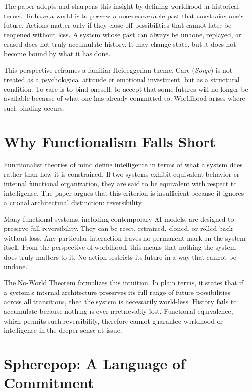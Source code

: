 \documentclass[11pt]{article}
\begin{document}
The paper adopts and sharpens this insight by defining worldhood in historical terms. To have a world is to possess a non-recoverable past that constrains one’s future. Actions matter only if they close off possibilities that cannot later be reopened without loss. A system whose past can always be undone, replayed, or erased does not truly accumulate history. It may change state, but it does not become bound by what it has done.

This perspective reframes a familiar Heideggerian theme. Care (\textit{Sorge}) is not treated as a psychological attitude or emotional investment, but as a structural condition. To care is to bind oneself, to accept that some futures will no longer be available because of what one has already committed to. Worldhood arises where such binding occurs.

\section{Why Functionalism Falls Short}

Functionalist theories of mind define intelligence in terms of what a system does rather than how it is constrained. If two systems exhibit equivalent behavior or internal functional organization, they are said to be equivalent with respect to intelligence. The paper argues that this criterion is insufficient because it ignores a crucial architectural distinction: reversibility.

Many functional systems, including contemporary AI models, are designed to preserve full reversibility. They can be reset, retrained, cloned, or rolled back without loss. Any particular interaction leaves no permanent mark on the system itself. From the perspective of worldhood, this means that nothing the system does truly matters to it. No action restricts its future in a way that cannot be undone.

The No-World Theorem formalizes this intuition. In plain terms, it states that if a system’s internal architecture preserves its full range of future possibilities across all transitions, then the system is necessarily world-less. History fails to accumulate because nothing is ever irretrievably lost. Functional equivalence, which permits such reversibility, therefore cannot guarantee worldhood or intelligence in the deeper sense at issue.

\section{Spherepop: A Language of Commitment}
\end{document}
